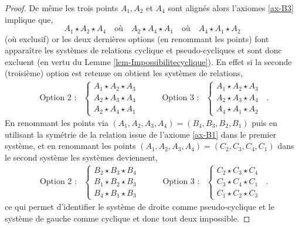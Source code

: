 \begin{cor}
\begin{proof}
        De même les trois points $A_1,A_2$ et $A_4$ sont alignés alors l'axiomes \ref{ax-B3} implique que,
        \begin{equation*}
            A_1 \star A_2 \star A_4 \quad\text{où}\quad A_2 \star A_4 \star A_1 \quad\text{où}\quad A_4 \star A_1 \star A_2 
        \end{equation*}
        (où exclusif) or les deux dernières options (en renommant les points) font apparaître les systèmes de relations cyclique et pseudo-cycliques et sont donc excluent (en vertu du Lemme \ref{lem-Impossibilitecyclique}). En effet si la seconde (troisième) option est retenue on obtient les systèmes de relations,
        \begin{equation*}
        \begin{array}{cccc}
        \text{Option 2 }:&\left\{
            \begin{array}{cc}
                 A_{1} \star A_{2} \star A_{3} \\
                 A_{2} \star A_{3} \star A_{4} \\
                 A_2 \star A_4 \star A_1
            \end{array}
            \right. &\qquad\text{Option 3 } :&    \left\{\begin{array}{c}
                 A_{1} \star A_{2} \star A_{3} \\
                 A_{2} \star A_{3} \star A_{4} \\
                 A_4 \star A_1 \star A_2
            \end{array}\right.
        \end{array} \,.
        \end{equation*}
        En renommant les points via $(A_1,A_2,A_3,A_4)=( B_4,B_3,B_2,B_1)$ puis en utilisant la symétrie de la relation  issue de l'axiome \ref{ax-B1} dans le premier système, et en renommant les points $(A_1,A_2,A_3,A_4)=(C_2,C_3,C_4,C_1)$ dans le second système les systèmes deviennent,
        \begin{equation*}
        \begin{array}{cccc}
        \text{Option 2 }:&\left\{
            \begin{array}{c}
                 B_{2} \star B_{3} \star B_{4} \\
                 B_{1} \star B_{2} \star B_{3} \\
                 B_4 \star B_1 \star B_3
            \end{array}
            \right. &\qquad\text{Option 3 } :&    \left\{\begin{array}{c}
                 C_2 \star C_3 \star C_4 \\
                 C_3 \star C_4 \star C_1 \\
                 C_1 \star C_2 \star C_3
            \end{array}\right.
        \end{array} \,.
        \end{equation*}
        ce qui permet d'identifier le système de droite comme pseudo-cyclique et le système de gauche comme cyclique et donc tout deux impossible.
        

\end{proof}
\end{cor}
